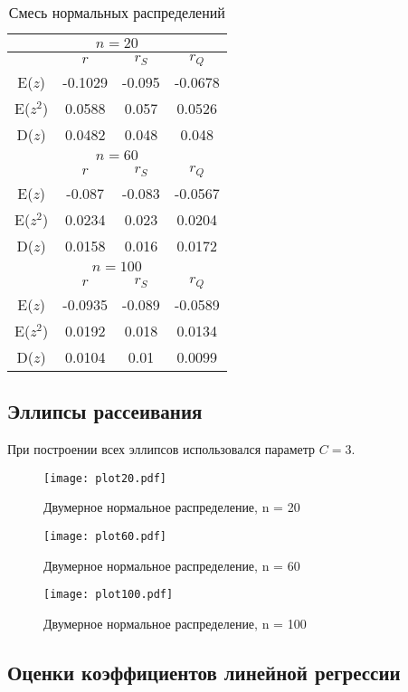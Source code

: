 \documentclass[a4paper,12pt]{article} %
\begin{document}
\begin{table}[H]
    \centering
\begin{tabular}{|c|c|c|c|}
\hline
\multicolumn{4}{|c|}{$n=20$}\\
\hline
&$r$&$r_S$&$r_Q$\\
\hline
E($z$)&-0.1029&-0.095&-0.0678\\
\hline
E($z^2$)&0.0588&0.057&0.0526\\
\hline
D($z$)&0.0482&0.048&0.048\\
\hline
\multicolumn{4}{|c|}{$n=60$}\\
\hline
&$r$&$r_S$&$r_Q$\\
\hline
E($z$)&-0.087&-0.083&-0.0567\\
\hline
E($z^2$)&0.0234&0.023&0.0204\\
\hline
D($z$)&0.0158&0.016&0.0172\\
\hline
\multicolumn{4}{|c|}{$n=100$}\\
\hline
&$r$&$r_S$&$r_Q$\\
\hline
E($z$)&-0.0935&-0.089&-0.0589\\
\hline
E($z^2$)&0.0192&0.018&0.0134\\
\hline
D($z$)&0.0104&0.01&0.0099\\
\hline
\end{tabular}
    \caption{Смесь нормальных распределений}
    \label{tab:norm_mix}
\end{table}
\subsection{Эллипсы рассеивания}
При построении всех эллипсов использовался параметр $C=3$.
\begin{figure}[H]
    \centering
    \texttt{[image: plot20.pdf]}
    \caption{Двумерное нормальное распределение, n = 20}
    \label{fig:n20}
\end{figure}
\begin{figure}[H]
    \centering
    \texttt{[image: plot60.pdf]}
    \caption{Двумерное нормальное распределение, n = 60}
    \label{fig:n60}
\end{figure}
\begin{figure}[H]
    \centering
    \texttt{[image: plot100.pdf]}
    \caption{Двумерное нормальное распределение, n = 100}
    \label{fig:n100}
\end{figure}
\subsection{Оценки коэффициентов линейной регрессии}
\end{document}
